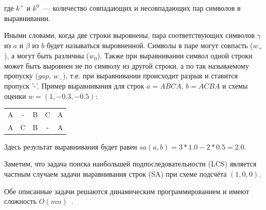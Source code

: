 где $k^{+}$ и $k^{0}$~--- количество совпадающих и несовпадающих пар символов в выравнивании.


Иными словами, когда две строки выровнены, пара соответствующих символов $\gamma$ из $a$ и $\beta$  из $b$ будет называться выровненной.
Символы в паре могут совпасть ($w_{+}$), а могут быть различны ($w_{0}$).
Также при выравнивании символ одной строки может  быть выровнен не по символу из другой строки, а по так называемому пропуску ($gap$, $w_{-}$), т.е. при выравнивании происходит разрыв и ставится пропуск '-'.
Пример выравнивания для строк $a=ABCA$, $b=ACBA$ и схемы оценки $w = (1, -0.3, -0.5)$:
\begin{center}
    \begin{tabular}{ccccc}
    A & - & B &  C  &  A \\
    A & C & B &  - &  A
    \end{tabular}
\end{center}
Здесь результат выравнивания будет равен $sa(a,b) = 3*1.0-2*0.5 = 2.0$.

Заметим, что задача поиска наибольшей подпоследовательности (LCS) является частным случаем задачи выравнивания строк (SA) при схеме подсчёта $(1,0,0)$.

Обе описанные задачи решаются динамическим программированием
и имеют сложность $O(mn)$~\cite{huang1994global}.

